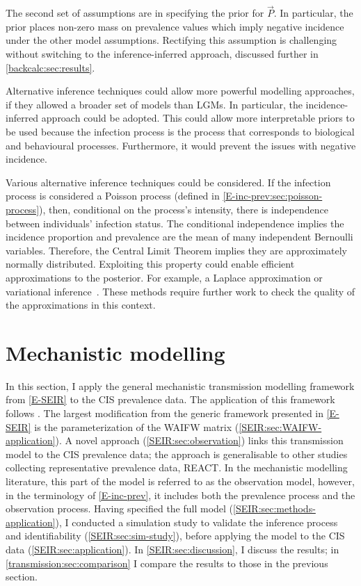 \documentclass[thesis.tex]{subfiles}
\begin{document}
The second set of assumptions are in specifying the prior for $\vec{P}$.
In particular, the prior places non-zero mass on prevalence values which imply negative incidence under the other model assumptions.
Rectifying this assumption is challenging without switching to the inference-inferred approach, discussed further in \cref{backcalc:sec:results}.

Alternative inference techniques could allow more powerful modelling approaches, if they allowed a broader set of models than LGMs.
In particular, the incidence-inferred approach could be adopted.
This could allow more interpretable priors to be used because the infection process is the process that corresponds to biological and behavioural processes.
Furthermore, it would prevent the issues with negative incidence.

Various alternative inference techniques could be considered.
If the infection process is considered a Poisson process (defined in \cref{E-inc-prev:sec:poisson-process}), then, conditional on the process's intensity, there is independence between individuals' infection status.
The conditional independence implies the incidence proportion and prevalence are the mean of many independent Bernoulli variables.
Therefore, the Central Limit Theorem implies they are approximately normally distributed.
Exploiting this property could enable efficient approximations to the posterior.
For example, a Laplace approximation or variational inference~\autocite{bleiVariational}.
These methods require further work to check the quality of the approximations in this context.


\section{Mechanistic modelling} \label{SEIR}

In this section, I apply the general mechanistic transmission modelling framework from \cref{E-SEIR} to the CIS prevalence data.
The application of this framework follows \textcite{birrellRealtime}.
The largest modification from the generic framework presented in \cref{E-SEIR} is the parameterization of the WAIFW matrix (\cref{SEIR:sec:WAIFW-application}).
A novel approach (\cref{SEIR:sec:observation}) links this transmission model to the CIS prevalence data; the approach is generalisable to other studies collecting representative prevalence data, \eg REACT.
In the mechanistic modelling literature, this part of the model is referred to as the observation model, however, in the terminology of \cref{E-inc-prev}, it includes both the prevalence process and the observation process.
Having specified the full model (\cref{SEIR:sec:methods-application}), I conducted a simulation study to validate the inference process and identifiability (\cref{SEIR:sec:sim-study}), before applying the model to the CIS data (\cref{SEIR:sec:application}).
In \cref{SEIR:sec:discussion}, I discuss the results; in \cref{transmission:sec:comparison} I compare the results to those in the previous section.
\end{document}
